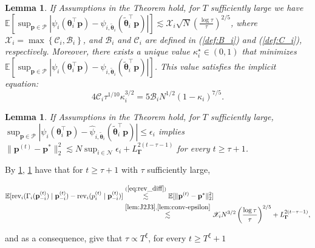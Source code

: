 \documentclass{article} %
\def\eqref#1{equation~\ref{#1}}
\renewcommand{\eqref}[1]{(\ref{#1})}
\newtheorem{lemma}[theorem]{Lemma}
\begin{document}
\begin{lemma}\label{lem:J2J3}
If Assumptions in the Theorem hold, for $T$ sufficiently large we have $\mathbb{E}[\sup_{\mathbf{p} \in \mathcal{P}}|\psi_i(\boldsymbol{\theta}_i^{\top}\mathbf{p})-\widehat{\psi}_{i,\widetilde{\boldsymbol{\theta}}_i}(\widetilde{\boldsymbol{\theta}}_i^{\top}\mathbf{p})|]\lesssim \mathscr{X}_i\sqrt{N}(\tfrac{\log \tau}{\tau})^{2/5}$, where $\mathscr{X}_i= \max\left\{\mathscr{C}_i,\mathscr{B}_i \right\}$, and $\mathscr{B}_i$ and $\mathscr{C}_i$ are defined in \eqref{def:B_i} and \eqref{def:C_i}, respectively. Moreover, there exists a unique value $\kappa_i^{\star}\in (0,1)$ that minimizes $\mathbb{E}[\sup_{\mathbf{p} \in \mathcal{P}}|\psi_i(\boldsymbol{\theta}_i^{\top}\mathbf{p})-\widehat{\psi}_{i,\widetilde{\boldsymbol{\theta}}_i}(\widetilde{\boldsymbol{\theta}}_i^{\top}\mathbf{p})|]$. This value satisfies the implicit equation:
\begin{equation*}
4 \mathscr{C}_i\tau^{1/10}\textstyle \kappa_i^{3/2} = 5 \mathscr{B}_i N^{1/2} (1-\kappa_i)^{7/5}.
\end{equation*}
\end{lemma}

\begin{lemma}\label{lem:conv-epsilon}
If Assumptions in the Theorem hold, for $T$ sufficiently large, $\sup_{\mathbf{p} \in \mathcal{P}}|\psi_i(\boldsymbol{\theta}_i^{\top}\mathbf{p})-\widehat{\psi}_{i,\widetilde{\boldsymbol{\theta}}_i}(\widetilde{\boldsymbol{\theta}}_i^{\top}\mathbf{p})|\leq \epsilon_i$ implies $\|\mathbf{p}^{(t)}-\mathbf{p}^*\|_2^2 \lesssim N\sup_{i \in \mathcal{N}}\epsilon_i+L^{2(t-\tau-1)}_{\boldsymbol{\Gamma}}$ for every $t \geq \tau+1$.
\end{lemma}
\noindent
By \cref{lem:J2J3}, \cref{lem:conv-epsilon} have that for $t\geq \tau +1$ with $\tau$ sufficiently large,

\begin{align}\label{reg_bound_NE}
\mathbb{E}[ \operatorname{rev}_i(\Gamma_i(\mathbf{p}^{(t)}_{-i}) \mid \mathbf{p}_{-i}^{(t)}) -  \operatorname{rev}_i(p^{(t)}_i \mid \mathbf{p}_{-i}^{(t)})] & \overset{\eqref{eq:rev_diff}}{\lesssim} \mathbb{E}[\|\mathbf{p}^{(t)}-\mathbf{p}^{*}\|_2^2]\nonumber\\
& \overset{\cref{lem:J2J3},\cref{lem:conv-epsilon}}{\lesssim} \mathscr{X}_i  N^{3/2}\left(\frac{
\log \tau}{\tau} \right)^{2/5} +L^{2(t-\tau-1)}_{\boldsymbol{\Gamma}},
\end{align}

and as a consequence, give that $\tau \propto T^{\xi}$, for every $t \geq T^{\xi}+1$
\end{document}
